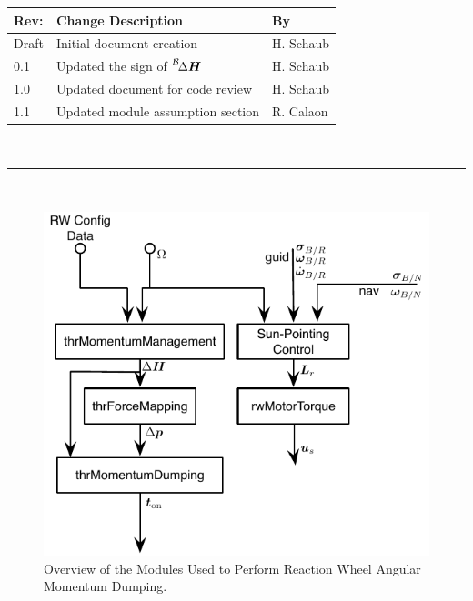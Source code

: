 \documentclass[]{BasiliskReportMemo}
\begin{document}
\makeCover


%
%
\pagestyle{empty}
{\renewcommand{\arraystretch}{1.1}
\noindent
\begin{longtable}{|p{0.5in}|p{4.5in}|p{1.14in}|}
\hline
{\bfseries Rev}: & {\bfseries Change Description} & {\bfseries By} \\
\hline
Draft & Initial document creation & H. Schaub \\
0.1 & Updated the sign of $\leftexp{B}{\Delta\bm H}$ & H. Schaub \\
1.0 & Updated document for code review & H. Schaub \\
1.1 & Updated module assumption section & R. Calaon \\
\hline

\end{longtable}
}

\newpage
\setcounter{page}{1}
\pagestyle{fancy}

\tableofcontents
~\\ \hrule ~\\

\begin{figure}[htb]
	\centerline{
	\includegraphics[]{Figures/rwMomentumOverview}
	}
	\caption{Overview of the Modules Used to Perform Reaction Wheel Angular Momentum Dumping.}
	\label{fig:Fig1}
\end{figure}
\end{document}

